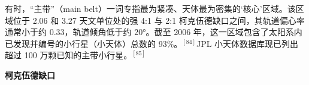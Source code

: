 有时，“主带”（main belt）一词专指最为紧凑、天体最为密集的‘核心’区域。该区域位于 2.06 和 3.27 天文单位处的强 4:1 与 2:1 柯克伍德缺口之间，其轨道偏心率通常小于约 0.33，轨道倾角低于约 20°。截至 2006 年，这一区域包含了太阳系内已发现并编号的小行星（小天体）总数的 93\%。$^{[84]}$JPL 小天体数据库现已列出超过 100 万颗已知的主带小行星。$^{[85]}$

\textbf{柯克伍德缺口}
